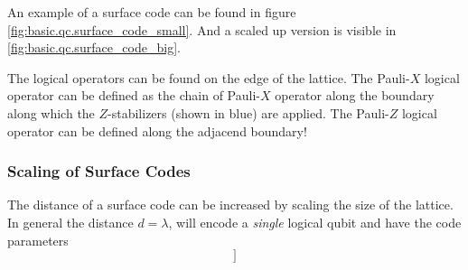 An example of a surface code can be found in figure \ref{fig:basic.qc.surface_code_small}.
And a scaled up version is visible in \ref{fig:basic.qc.surface_code_big}. \cite{QECintro}

The logical operators can be found on the edge of the lattice. 
The Pauli-$X$ logical operator can be defined as the chain of Pauli-$X$ operator along the boundary along which the $Z$-stabilizers (shown in blue) are applied.
The Pauli-$Z$ logical operator can be defined along the adjacend boundary! \cite{QECintro}


\subsubsection{Scaling of Surface Codes}
The distance of a surface code can be increased by scaling the size of the lattice.
In general the distance $d=\lambda$, will encode a \textit{single} logical qubit and have the code parameters \cite{QECintro}
\begin{equation}
    [[n = \lambda^2 + (\lambda-1)^2, k=1 ]]
\end{equation}


